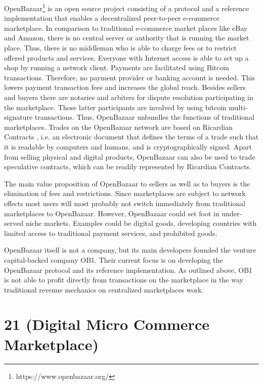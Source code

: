 OpenBazaar\footnote{https://www.openbazaar.org/} is an open source project consisting of a protocol and a reference 
implementation that enables a decentralized peer-to-peer e-commerce marketplace. 
In comparison to traditional e-commerce market places like eBay and Amazon, there 
is no central server or authority that is running the market place. Thus, there 
is no middleman who is able to charge fees or to restrict offered products and 
services. Everyone with Internet access is able to set up a shop by running a network 
client. Payments are facilitated using Bitcoin transactions. Therefore, no payment 
provider or banking account is needed. This lowers payment transaction fees and 
increases the global reach. Besides sellers and buyers there are notaries and arbiters 
for dispute resolution participating in the marketplace. Those latter participants 
are involved by using bitcoin multi-signature transactions. Thus, OpenBazaar unbundles 
the functions of traditional marketplaces. Trades on the OpenBazaar network are 
based on Ricardian Contracts \parencite{1319505}, i.e. an electronic document that defines 
the terms of a trade such that it is readable by computers and humans, and is cryptographically 
signed. Apart from selling physical and digital products, OpenBazaar can also be 
used to trade speculative contracts, which can be readily represented by Ricardian 
Contracts. 

The main value proposition of OpenBazaar to sellers as well as to buyers is the 
elimination of fees and restrictions. Since marketplaces are subject to network 
effects most users will most probably not switch immediately from traditional marketplaces 
to OpenBazaar. However, OpenBazaar could set foot in under-served niche markets. 
Examples could be digital goods, developing countries with limited access to traditional 
payment services, and prohibited goods. 

OpenBazaar itself is not a company, but its main developers founded the venture 
capital-backed company OB1. Their current focus is on developing the OpenBazaar 
protocol and its reference implementation. As outlined above, OB1 is not able to 
profit directly from transactions on the marketplace in the way traditional revenue 
mechanics on centralized marketplaces work. 

\section{21 (Digital Micro Commerce Marketplace)}
\label{sec:eco21}

